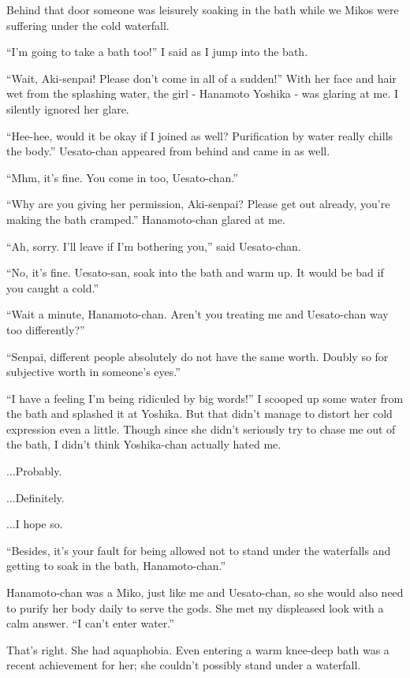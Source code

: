 Behind that door someone was leisurely soaking in the bath while we Mikos were suffering under the cold waterfall.

``I'm going to take a bath too!'' I said as I jump into the bath.

``Wait, Aki-senpai! Please don't come in all of a sudden!''  With her face and hair wet from the splashing water, the girl - Hanamoto Yoshika - was glaring at me. I silently ignored her glare.

``Hee-hee, would it be okay if I joined as well? Purification by water really chills the body.''  Uesato-chan appeared from behind and came in as well.

``Mhm, it's fine. You come in too, Uesato-chan.''

``Why are you giving her permission, Aki-senpai? Please get out already, you're making the bath cramped.'' Hanamoto-chan glared at me.

``Ah, sorry. I'll leave if I'm bothering you,'' said Uesato-chan.

``No, it's fine. Uesato-san, soak into the bath and warm up. It would be bad if you caught a cold.''

``Wait a minute, Hanamoto-chan. Aren't you treating me and Uesato-chan way too differently?''

``Senpai, different people absolutely do not have the same worth. Doubly so for subjective worth in someone's eyes.''

``I have a feeling I'm being ridiculed by big words!''  I scooped up some water from the bath and splashed it at Yoshika. But that didn't manage to distort her cold expression even a little. Though since she didn't seriously try to chase me out of the bath, I didn't think Yoshika-chan actually hated me.

...Probably.

...Definitely.

...I hope so.

``Besides, it's your fault for being allowed not to stand under the waterfalls and getting to soak in the bath, Hanamoto-chan.''

Hanamoto-chan was a Miko, just like me and Uesato-chan, so she would also need to purify her body daily to serve the gods. She met my displeased look with a calm answer.  ``I can't enter water.''

That's right. She had aquaphobia. Even entering a warm knee-deep bath was a recent achievement for her; she couldn't possibly stand under a waterfall.

